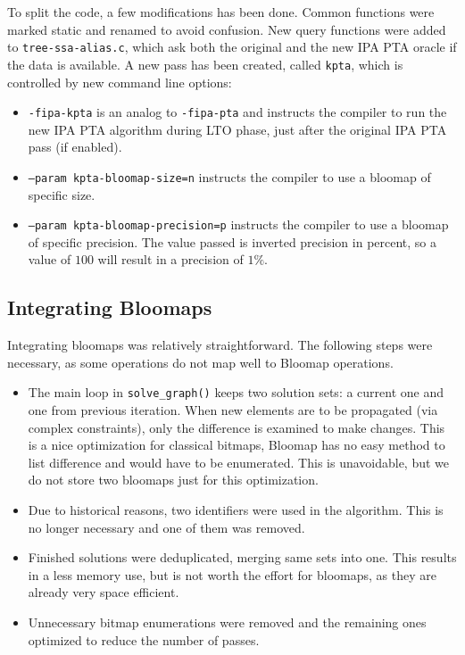 To split the code, a few modifications has been done. Common functions were
marked static and renamed to avoid confusion. New query functions were added to
{\tt tree-ssa-alias.c}, which ask both the original and the new IPA PTA oracle
if the data is available. A new pass has been created, called {\tt kpta}, which
is controlled by new command line options:

\begin{itemize}
	\item {\tt -fipa-kpta} is an analog to {\tt -fipa-pta} and instructs the compiler to run the new IPA PTA algorithm during LTO phase, just after the original IPA PTA pass (if enabled).
	\item {\tt --param kpta-bloomap-size=n} instructs the compiler to use a bloomap of specific size.
	\item {\tt --param kpta-bloomap-precision=p} instructs the compiler to use a bloomap of specific precision. The value passed is inverted precision in percent, so a value of $100$ will result in a precision of $1\%$.
\end{itemize}


\subsection{Integrating Bloomaps}

Integrating bloomaps was relatively straightforward. The following steps were necessary, as some operations do not map well to Bloomap operations.

\begin{itemize}
	\item The main loop in {\tt solve\_graph()} keeps two solution sets: a
		current one and one from previous iteration. When new elements are to
		be propagated (via complex constraints), only the difference is
		examined to make changes. This is a nice optimization for classical
		bitmaps, Bloomap has no easy method to list difference and would have
		to be enumerated. This is unavoidable, but we do not store two bloomaps
		just for this optimization.
	\item Due to historical reasons, two identifiers were used in the
		algorithm. This is no longer necessary and one of them was removed.
	\item Finished solutions were deduplicated, merging same sets into one. This
		results in a less memory use, but is not worth the effort
		for bloomaps, as they are already very space efficient.
	\item Unnecessary bitmap enumerations were removed and the remaining ones
		optimized to reduce the number of passes.
\end{itemize}

